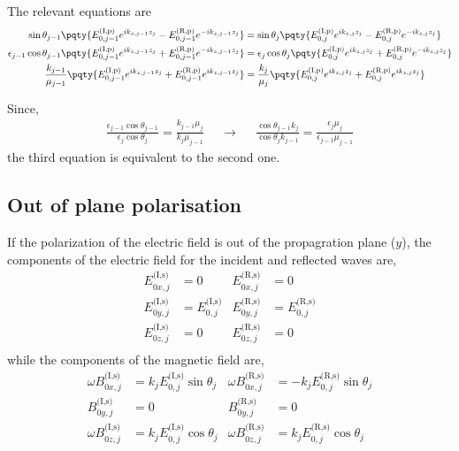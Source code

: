 The relevant equations are
\begin{align*}
	\sin\theta_{j-1}\pqty{E^{\text{(I,p)}}_{0,j-1}e^{ik_{z,j-1}z_j} - E^{\text{(R,p)}}_{0,j-1}e^{-ik_{z,j-1}z_j}} &=
	\sin\theta_{j}\pqty{E^{\text{(I,p)}}_{0,j}e^{ik_{z,j}z_j} - E^{\text{(R,p)}}_{0,j}e^{-ik_{z,j}z_j}} 
	\\
	\epsilon_{j-1} \cos\theta_{j-1} \pqty{E^{\text{(I,p)}}_{0,j-1}e^{ik_{z,j-1}z_j} + E^{\text{(R,p)}}_{0,j-1}e^{-ik_{z,j-1}z_j}} &=
	\epsilon_{j} \cos\theta_{j} \pqty{E^{\text{(I,p)}}_{0,j}e^{ik_{z,j}z_j} + E^{\text{(R,p)}}_{0,j} e^{-ik_{z,j}z_j}} 
	\\
	\frac{k_{j-1}}{\mu_{j-1}}\pqty{E^{\text{(I,p)}}_{0,j-1} e^{ik_{z,j-1}z_j} + E^{\text{(R,p)}}_{0,j-1} e^{ik_{z,j-1}z_j}} &=
	\frac{k_{j}}{\mu_{j}}\pqty{E^{\text{(I,p)}}_{0,j} e^{ik_{z,j}z_j} + E^{\text{(R,p)}}_{0,j} e^{ik_{z,j}z_j}}
\end{align*}

Since,
\begin{align*}
	\frac{\epsilon_{j-1} \cos\theta_{j-1}}{\epsilon_{j} \cos\theta_{j}} = \frac{k_{j-1}\mu_{j}}{k_{j}\mu_{j-1}} && \to & &
	\frac{ \cos\theta_{j-1} k_{j}}{ \cos\theta_{j} k_{j-1}} = \frac{\epsilon_{j}\mu_{j}}{\epsilon_{j-1}\mu_{j-1}}
\end{align*}
the third equation is equivalent to the second one.

\subsection{Out of plane polarisation} %
\label{sub:out_of_plane_polarisation}

If the polarization of the electric field is out of the propagration plane ($y$), the components of the electric field for the incident and reflected waves are,
\begin{align*}
	E^{\text{(I,s)}}_{0x,j} &= 0 & E^{\text{(R,s)}}_{0x,j} &= 0 \\
	E^{\text{(I,s)}}_{0y,j} &= E^{\text{(I,s)}}_{0,j} & E^{\text{(R,s)}}_{0y,j} &= E^{\text{(R,s)}}_{0,j} \\
	E^{\text{(I,s)}}_{0z,j} &= 0 & E^{\text{(R,s)}}_{0z,j} &= 0 \\
\end{align*}
while the components of the magnetic field are,
\begin{align*}
	\omega B^{\text{(I,s)}}_{0x,j} &= k_j E^{\text{(I,s)}}_{0,j}\sin\theta_j & \omega B^{\text{(R,s)}}_{0x,j} &= -k_j E^{\text{(R,s)}}_{0,j}\sin\theta_j \\
	B^{\text{(I,s)}}_{0y,j} &= 0 & B^{\text{(R,s)}}_{0y,j} &= 0 \\
	\omega B^{\text{(I,s)}}_{0z,j} &= k_j E^{\text{(I,s)}}_{0,j}\cos\theta_j & \omega B^{\text{(R,s)}}_{0z,j} &= k_j E^{\text{(R,s)}}_{0,j}\cos\theta_j \\
\end{align*}

